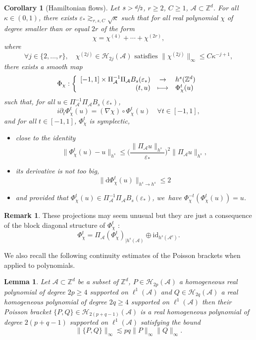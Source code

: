 \documentclass[JEP,XML,SOM,Unicode,published]{cedram}
\let\dpl\displaystyle
\newcommand\mto{\mathchoice{\longmapsto}{\mapsto}{\mapsto}{\mapsto}}
\theoremstyle{plain}
\newtheorem{corollary}[theorem]{Corollary}
\newtheorem{lemma}[theorem]{Lemma}
\theoremstyle{definition}
\newtheorem{remark}[theorem]{Remark}
\newcommand{\1}{\mathbf{1}}
\begin{document}
\begin{corollary}[Hamiltonian flows]\label{cor:flow} Let $s > \sfrac{d}{2}$, $r\geq 2$, $C\geq 1$, $\mathcal{A} \subset \mathbb{Z}^d$. For all $\kappa \in (0,1)$, there exists $\varepsilon_* \gtrsim_{r,s,C} \sqrt{\kappa}$ such that for all real polynomial $\chi$ of degree smaller than or equal $2r$ of the form
\[
\chi = \chi^{(4)} + \cdots + \chi^{(2r)},
\]
where
\[
\forall j\in \{ 2,\dots,r\}, \quad \chi^{(2j)} \in \mathcal{H}_{2j}(\mathcal{A})\text{ satisfies } \| \chi^{(2j)} \|_{\infty} \leq C\kappa^{-j+1},
\]
there exists a smooth map
\[
\Phi_{\chi} : \left\{
\begin{array}{rcl} [-1,1] \times \Pi_{\mathcal{A}}^{-1}\Pi_{\mathcal{A}}B_s(\varepsilon_*) & \dpl\to & h^s(\mathbb{Z}^d) \\
(t,u) & \dpl\mto & \Phi_\chi^t(u)
\end{array}\right.
\]
such that, for all $u\in \Pi_{\mathcal{A}}^{-1}\Pi_{\mathcal{A}}B_s(\varepsilon_*) $,
\[
i\partial_t \Phi_\chi^t(u) = (\nabla \chi)\circ \Phi_\chi^t (u) \quad \forall t \in [-1,1],
\]
and for all $t\in [-1,1]$, $\Phi_\chi^t$ is symplectic,
\begin{itemize}
\item close to the identity
\[
\| \Phi_\chi^t(u) - u \|_{h^s} \leq \Big(\frac{\| \Pi_{\mathcal{A}}u \|_{h^s}}{ \varepsilon_* } \Big)^2 \| \Pi_{\mathcal{A}} u\|_{h^s},
\]
\item its derivative is not too big, \ie
\begin{equation}
\label{eq:d-varphi}
\| \mathrm{d} \Phi_\chi^t(u) \|_{h^s \to h^s} \leq 2
\end{equation}
\item and provided that $\Phi_\chi^t(u) \in \Pi_{\mathcal{A}}^{-1}\Pi_{\mathcal{A}}B_s(\varepsilon_*)$, we~have $\Phi_\chi^{-t}(\Phi_\chi^t(u)) = u $.
\end{itemize}
\end{corollary}

\begin{remark}
These projections may seem unusual but they are just a consequence of the block diagonal structure of $\Phi_\chi^t$ :
\[
\Phi_\chi^t = \Pi_{\mathcal{A}} (\Phi_\chi^t)_{| h^s(\mathcal{A})} \oplus \mathrm{id}_{h^s(\mathcal{A}^c)}.
\]
\end{remark}

We also recall the following continuity estimates of the Poisson brackets when applied to polynomials.
\begin{lemma} Let $\mathcal{A} \subset \mathbb{Z}^d$ be a subset of $\mathbb{Z}^d$, $P \in \mathcal{H}_{2p}(\mathcal{A})$ a homogeneous real polynomial of degree $2p\geq 4$ supported on $\ell^1(\mathcal{A})$ and $Q \in \mathcal{H}_{2q}(\mathcal{A})$ a real homogeneous polynomial of degree $2q\geq 4$ supported on $\ell^1(\mathcal{A})$ then their Poisson bracket $\{P,Q\} \in \mathcal{H}_{2(p+q-1)}(\mathcal{A})$ is a real homogeneous polynomial of degree $2(p+q-1)$ supported on $\ell^1(\mathcal{A})$ satisfying the bound
\[
\| \{ P,Q\} \|_{\infty} \lesssim pq \|P\|_{\infty} \| Q\|_{\infty}.
\]
\end{lemma}
\end{document}

